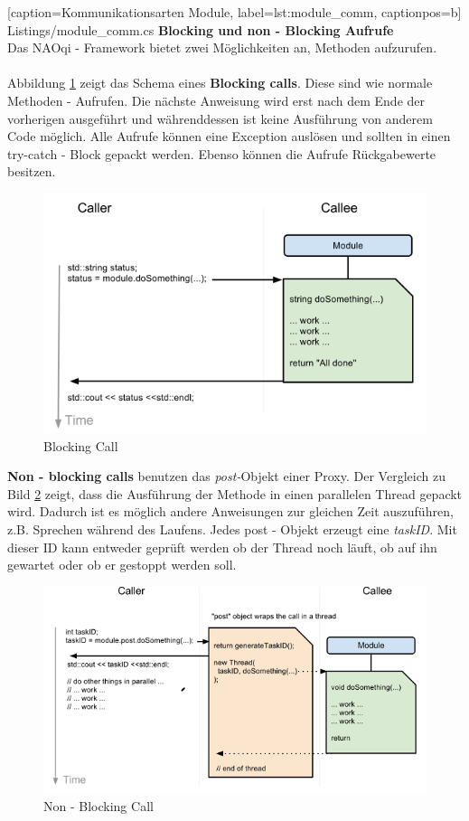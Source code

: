 
    [caption={Kommunikationsarten Module},
       label=lst:module_comm,
       captionpos=b]	
 {Listings/module_comm.cs}
\noindent	
\textbf{Blocking und non - Blocking Aufrufe}
\\
Das NAOqi - Framework bietet zwei Möglichkeiten an, Methoden aufzurufen. 
\\
\\
Abbildung \ref{f:naoqi_blockingcall} zeigt das Schema eines \textbf{Blocking calls}. Diese sind wie normale Methoden - Aufrufen. Die nächste Anweisung wird erst nach dem Ende der vorherigen ausgeführt und währenddessen ist keine Ausführung von anderem Code möglich. Alle Aufrufe können eine Exception auslösen und sollten in einen try-catch - Block gepackt werden. Ebenso können die Aufrufe Rückgabewerte besitzen.
\begin{figure}[H]						
	\centering							
	\includegraphics[scale=0.8]{Bilder/blockingcall.PNG}
	\caption{Blocking Call}						
	\label{f:naoqi_blockingcall}						
\end{figure}
\textbf{Non - blocking calls} benutzen das \textit{post-}Objekt einer Proxy. Der Vergleich zu Bild \ref{f:naoqi_nonblockingcall} zeigt, dass die Ausführung der Methode in einen parallelen Thread gepackt wird. Dadurch ist es möglich andere Anweisungen zur gleichen Zeit auszuführen, z.B. Sprechen während des Laufens. Jedes post - Objekt erzeugt eine \textit{taskID}. Mit dieser ID kann entweder geprüft werden ob der Thread noch läuft, ob auf ihn gewartet oder ob er gestoppt werden soll. 
\begin{figure}[H]						
	\centering							
	\includegraphics[scale=0.8]{Bilder/nonblockingcall.PNG}
	\caption{Non - Blocking Call}						
	\label{f:naoqi_nonblockingcall}						
\end{figure}



